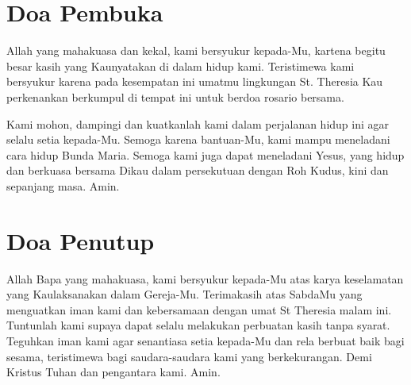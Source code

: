 \documentclass[12pt,a4paper]{article}
\author{Yohanes Suyanto}
\begin{document}
\onehalfspacing
\section*{Doa Pembuka}
\thispagestyle{empty}
Allah yang mahakuasa dan kekal, kami bersyukur kepada-Mu, kartena begitu besar kasih yang Kaunyatakan di dalam hidup kami. Teristimewa kami bersyukur karena pada kesempatan ini umatmu lingkungan St. Theresia Kau perkenankan berkumpul di tempat ini untuk berdoa rosario bersama.

Kami mohon, dampingi dan kuatkanlah kami dalam perjalanan hidup ini agar selalu setia kepada-Mu. Semoga karena bantuan-Mu, kami mampu meneladani cara hidup Bunda Maria. Semoga kami juga dapat meneladani Yesus, yang hidup dan berkuasa bersama Dikau dalam persekutuan dengan Roh Kudus, kini dan sepanjang masa. Amin.


\section*{Doa Penutup}
Allah Bapa yang mahakuasa, kami bersyukur kepada-Mu atas karya keselamatan yang Kaulaksanakan dalam Gereja-Mu. Terimakasih atas SabdaMu yang menguatkan iman kami dan kebersamaan dengan umat St Theresia malam ini.
Tuntunlah kami supaya dapat selalu melakukan perbuatan kasih tanpa syarat. Teguhkan iman kami agar senantiasa setia kepada-Mu dan rela berbuat baik bagi sesama, teristimewa bagi saudara-saudara kami yang berkekurangan. Demi Kristus Tuhan dan pengantara kami. Amin.
 
\end{document}

